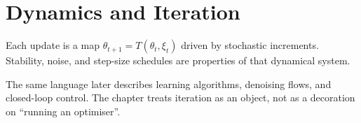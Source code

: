 \chapter{Dynamics and Iteration}
\label{ch:dynamics}

Each update is a map $\theta_{t+1} = T(\theta_t, \xi_t)$ driven by stochastic increments. Stability, noise, and step-size schedules are properties of that dynamical system.

The same language later describes learning algorithms, denoising flows, and closed-loop control. The chapter treats iteration as an object, not as a decoration on ``running an optimiser''.
